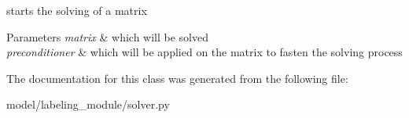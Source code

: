 starts the solving of a matrix 


\begin{DoxyParams}{Parameters}
{\em matrix} & which will be solved \\
\hline
{\em preconditioner} & which will be applied on the matrix to fasten the solving process \\
\hline
\end{DoxyParams}


The documentation for this class was generated from the following file\+:\begin{DoxyCompactItemize}
\item 
model/labeling\+\_\+module/solver.\+py\end{DoxyCompactItemize}
